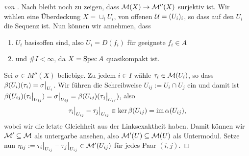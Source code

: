 \begin{proof}[von 
    ]
    Nach  bleibt noch
    zu zeigen, dass $\M(X) \to \M''(X)$ surjektiv ist. Wir wählen 
    eine Überdeckung $X = \cup_i U_i$, von offenen $\cal U = (U_i)_i$,
    so dass auf den $U_i$ die 
    Sequenz  ist. 
    Nun können wir \obda annehmen, dass 
    \begin{enumerate}
      \item $U_i$ basisoffen sind, also $U_i = D(f_i)$ für geeignete 
        $f_i \in A$
      \item und $\# I < \infty$, da $X = \Spec A$ quasikompakt ist.
    \end{enumerate}
    \newcommand{\Uij}{U_{ij}}
    Sei $\sigma \in M''(X)$ beliebige. Zu jedem $i\in I$ 
    wähle $\tau_i \in \M(U_i)$, so dass
    $\beta(U_i)(\tau_i) = \sigma\rest{U_i}$. Wir führen die
    Schreibweise $U_{ij} := U_i \cap U_j$ ein und damit ist
    $\beta(U_{ij})(\tau_i\rest{U_{ij}}) = \sigma\rest{U_{ij}} = 
    \beta(U_{ij})(\tau_j\rest{U_{ij}})$, also
    \[\tau_i\rest{U_{ij}} - \tau_j\rest{U_{ij}} \in \ker\beta(U_{ij}) 
        = \im\alpha(U_{ij}),\]
     wobei wir die letzte Gleichheit aus der Linksexaktheit haben. Damit
     können wir \obda $\M'\subseteq \M$ als untergarbe ansehen, also
     $\M'(U) \subseteq \M(U)$ als Untermodul.
     Setze nun $\eta_{ij} := \tau_i\rest{\Uij} - \tau_j\rest{\Uij} \in 
     \M'(\Uij)$ für jedes Paar $(i,j)$.
     

\end{proof}
